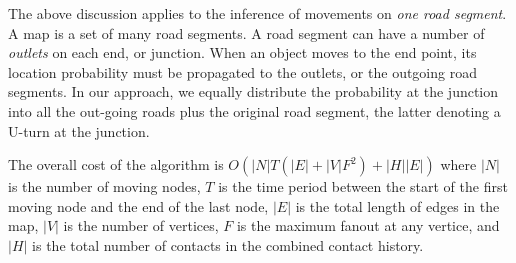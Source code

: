 The above discussion applies to the inference of movements on 
{\em one road segment}.
A map is a set of many road segments. A road segment can have
a number of {\em outlets} on each end, or junction. When an object
moves to the end point, its location probability must be propagated
to the outlets, or the outgoing road segments. 
In our approach, we equally distribute the probability at the junction 
into all the out-going roads plus the original road segment, the latter
denoting a U-turn at the junction. 

The overall cost of the algorithm is $O(|N|T(|E|+|V|F^2)+|H||E|)$
where $|N|$ is the number of moving nodes, 
$T$ is the time period between the start of the first moving node 
and the end of the last node, 
$|E|$ is the total length of edges in the map, 
$|V|$ is the number of vertices, $F$ is the maximum fanout
at any vertice,
and $|H|$ is the total number of contacts in the combined contact history. 
